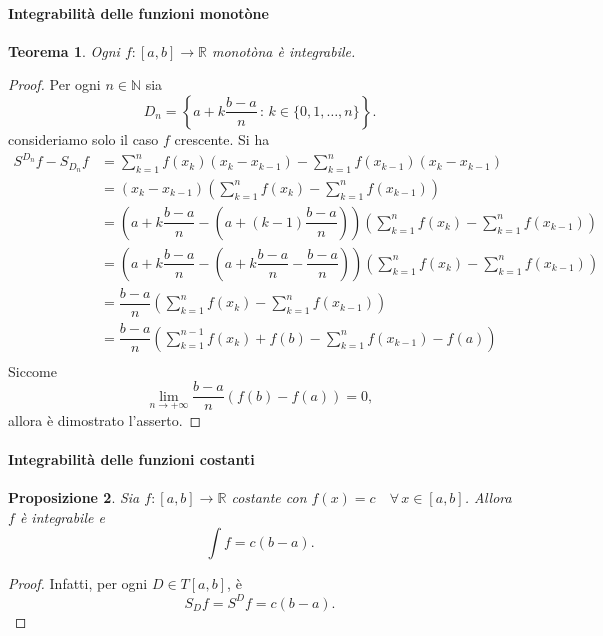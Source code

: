 \documentclass{article}
\theoremstyle{plain}
\newtheorem{thm}{Teorema}[section]
\newtheorem{prop}[thm]{Proposizione}
\theoremstyle{definition}
\theoremstyle{remark}
\begin{document}
\paragraph{Integrabilità delle funzioni monotòne}
\begin{bxthm}
\begin{thm}
    Ogni $f:[a,b]\to\mathbb{R}$ monotòna è integrabile. 
\end{thm}
\end{bxthm}
\begin{proof}
    Per ogni $n\in \mathbb{N}$ sia \[ D_n=\left\{a+k\dfrac{b-a}{n}\,:\,k\in\{0,1,\dots,n\}\right\}.\]
    consideriamo solo il caso $f$ crescente.
    Si ha 
    \begin{align*}
        S^{D_n}f-S_{D_n}f&=\sum_{k=1}^{n}f(x_k)(x_k-x_{k-1})-\sum_{k=1}^{n}f(x_{k-1})(x_k-x_{k-1})\\
        &=(x_k-x_{k-1})\left(\sum_{k=1}^{n}f(x_k)-\sum_{k=1}^{n}f(x_{k-1})\right)\\
        &=\left(a+k\dfrac{b-a}{n}-\left(a+(k-1)\dfrac{b-a}{n}\right)\right)\left(\sum_{k=1}^{n}f(x_k)-\sum_{k=1}^{n}f(x_{k-1})\right)\\
        &=\left(a+k\dfrac{b-a}{n}-\left(a+k\dfrac{b-a}{n}-\dfrac{b-a}{n}\right)\right)\left(\sum_{k=1}^{n}f(x_k)-\sum_{k=1}^{n}f(x_{k-1})\right)\\
        &=\dfrac{b-a}{n}\left(\sum_{k=1}^{n}f(x_k)-\sum_{k=1}^{n}f(x_{k-1})\right)\\
        &=\dfrac{b-a}{n}\left(\sum_{k=1}^{n-1}f(x_k)+f(b)-\sum_{k=1}^{n}f(x_{k-1})-f(a)\right)\\
    \end{align*}   
    Siccome 
    \[\lim_{n\to+\infty}\dfrac{b-a}{n}(f(b)-f(a))=0,\] 
    allora è dimostrato l'asserto.
\end{proof}

\vspace{10pt}

\paragraph{Integrabilità delle funzioni costanti}
\begin{bxthm}
\begin{prop}
    Sia $f:[a,b]\to\mathbb{R}$ costante con $f(x)=c\quad\forall\,x\in[a,b]$. Allora $f$ è integrabile e \[\int f=c(b-a).\]
\end{prop}
\end{bxthm}
\begin{proof}
    Infatti, per ogni $D\in T[a,b]$, è \[S_Df=S^Df=c(b-a).\]
\end{proof}
\end{document}
